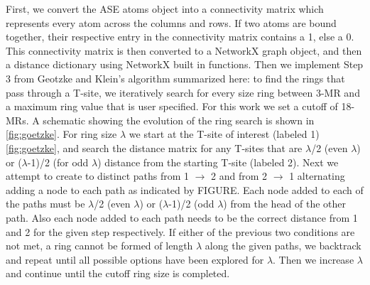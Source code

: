 \documentclass[11pt]{article}
\begin{document}
First, we convert the ASE atoms object into a connectivity matrix which represents every atom across the columns and rows. If two atoms are bound together, their respective entry in the connectivity matrix contains a 1, else a 0. This connectivity matrix is then converted to a NetworkX graph object, and then a distance dictionary using NetworkX built in functions. Then we implement Step 3 from Geotzke and Klein's algorithm \cite{goetzke-properties-1991} summarized here: to find the rings that pass through a T-site, we iteratively search for every size ring between 3-MR and a maximum ring value that is user specified. For this work we set a cutoff of 18-MRs. A schematic showing the evolution of the ring search is shown in \cref{fig:goetzke}. For ring size \(\lambda\) we start at the T-site of interest (labeled 1) \cref{fig:goetzke}, and search the distance matrix for any T-sites that are \(\lambda\)/2 (even \(\lambda\)) or (\(\lambda\)-1)/2 (for odd \(\lambda\)) distance from the starting T-site (labeled 2). Next we attempt to create to distinct paths from 1 \(\rightarrow\) 2 and from 2 \(\rightarrow\) 1 alternating adding a node to each path as indicated by FIGURE. Each node added to each of the paths must be \(\lambda\)/2 (even \(\lambda\)) or (\(\lambda\)-1)/2 (odd \(\lambda\)) from the head of the other path. Also each node added to each path needs to be the correct distance from 1 and 2 for the given step respectively. If either of the previous two conditions are not met, a ring cannot be formed of length \(\lambda\) along the given paths, we backtrack and repeat until all possible options have been explored for \(\lambda\). Then we increase \(\lambda\) and continue until the cutoff ring size is completed.
\end{document}
